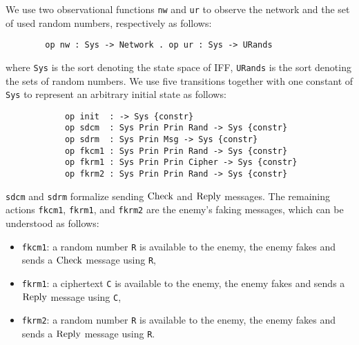 \documentclass[a4paper,fleqn]{cas-dc}
\begin{document}
We use two observational functions \verb!nw! and \verb!ur! to observe the network and the set of used random numbers, respectively as follows:
	\begin{small}
	\begin{verbatim}
		op nw : Sys -> Network . op ur : Sys -> URands
		\end{verbatim}
	\end{small}
	\noindent
	where \verb!Sys! is the sort denoting the state space of IFF, \verb!URands! is the sort denoting the sets of random numbers.
We use five transitions together with one constant of \verb!Sys! to represent an arbitrary initial state as follows: 
	\begin{small}
		\begin{verbatim}
			op init  : -> Sys {constr}
			op sdcm  : Sys Prin Prin Rand -> Sys {constr}
			op sdrm  : Sys Prin Msg -> Sys {constr}
			op fkcm1 : Sys Prin Prin Rand -> Sys {constr}
			op fkrm1 : Sys Prin Prin Cipher -> Sys {constr}
			op fkrm2 : Sys Prin Prin Rand -> Sys {constr}
		\end{verbatim}
	\end{small}
	
	\noindent
	\verb!sdcm! and \verb!sdrm! formalize sending $\rm Check$ and $\rm Reply$ messages.
	The remaining actions \verb!fkcm1!, \verb!fkrm1!, and \verb!fkrm2! are the enemy's faking messages, which can be understood as follows:
	\begin{itemize}
		\item \verb!fkcm1!: a random number \verb!R! is available to the enemy, the enemy fakes and sends a $\rm Check$ message using \verb!R!, 
		\item \verb!fkrm1!: a ciphertext \verb!C! is available to the enemy, the enemy fakes and sends a $\rm Reply$ message using \verb!C!, 
		\item \verb!fkrm2!: a random number \verb!R! is available to the enemy, the enemy fakes and sends a $\rm Reply$ message using \verb!R!.
	\end{itemize}
	
\end{document}
